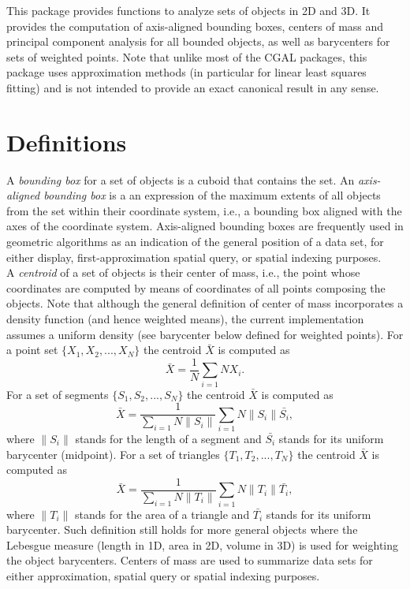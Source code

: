 This package provides functions to analyze sets of objects in 2D and 3D. It provides the computation of axis-aligned bounding boxes, centers of mass and principal component analysis for all bounded objects, as well as barycenters for sets of weighted points. Note that unlike most of the CGAL packages, this package uses approximation methods (in particular for linear least squares fitting) and is not intended to provide an exact canonical result in any sense. 

\section{Definitions}

A \emph{bounding box} for a set of objects is a cuboid that contains the set. An \emph{axis-aligned bounding box} is a an expression of the maximum extents of all objects from the set within their coordinate system, i.e., a bounding box aligned with the axes of the coordinate system. Axis-aligned bounding boxes are frequently used in geometric algorithms as an indication of the general position of a data set, for either display, first-approximation spatial query, or spatial indexing purposes. \\

A \emph{centroid} of a set of objects is their center of mass, i.e., the point whose coordinates are computed by means of coordinates of all points composing the objects. Note that although the general definition of center of mass incorporates a density function (and hence weighted means), the current implementation assumes a uniform density (see barycenter below defined for weighted points). For a point set $\{X_1,X_2,...,X_N\}$ the centroid $\bar{X}$ is computed as $$\bar{X} = \frac{1}{N} \sum_{i=1}{N} X_i.$$ For a set of segments $\{S_1,S_2,...,S_N\}$ the centroid $\bar{X}$ is computed as $$\bar{X} = \frac{1}{\sum_{i=1}{N}\|S_i\|} \sum_{i=1}{N} \|S_i\| \bar{S_i},$$ where $\|S_i\|$ stands for the length of a segment and $\bar{S_i}$ stands for its uniform barycenter (midpoint). For a set of triangles $\{T_1,T_2,...,T_N\}$ the centroid $\bar{X}$ is computed as $$\bar{X} = \frac{1}{\sum_{i=1}{N}\|T_i\|} \sum_{i=1}{N} \|T_i\| \bar{T_i},$$ where $\|T_i\|$ stands for the area of a triangle and $\bar{T_i}$ stands for its uniform barycenter. Such definition still holds for more general objects where the Lebesgue measure (length in 1D, area in 2D, volume in 3D) is used for weighting the object barycenters. Centers of mass are used to summarize data sets for either approximation, spatial query or spatial indexing purposes.\\

